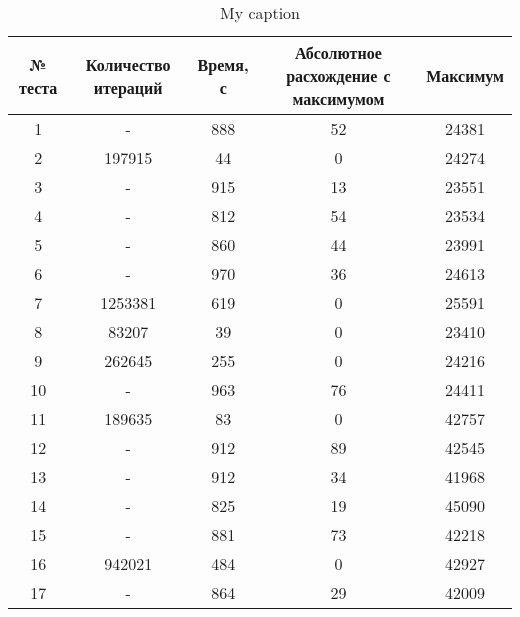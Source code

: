 \begin{table}[]
\centering
\caption{My caption}
\label{my-label}
\begin{tabular}{|c|c|c|c|c|}
\hline
№ теста & Количество итераций & Время, с & Абсолютное расхождение с максимумом & Максимум \\ \hline
1       & -                   & 888      & 52                                  & 24381    \\ \hline
2       & 197915              & 44       & 0                                   & 24274    \\ \hline
3       & -                   & 915      & 13                                  & 23551    \\ \hline
4       & -                   & 812      & 54                                  & 23534    \\ \hline
5       & -                   & 860      & 44                                  & 23991    \\ \hline
6       & -                   & 970      & 36                                  & 24613    \\ \hline
7       & 1253381             & 619      & 0                                   & 25591    \\ \hline
8       & 83207               & 39       & 0                                   & 23410    \\ \hline
9       & 262645              & 255      & 0                                   & 24216    \\ \hline
10      & -                   & 963      & 76                                  & 24411    \\ \hline
11      & 189635              & 83       & 0                                   & 42757    \\ \hline
12      & -                   & 912      & 89                                  & 42545    \\ \hline
13      & -                   & 912      & 34                                  & 41968    \\ \hline
14      & -                   & 825      & 19                                  & 45090    \\ \hline
15      & -                   & 881      & 73                                  & 42218    \\ \hline
16      & 942021              & 484      & 0                                   & 42927    \\ \hline
17      & -                   & 864      & 29                                  & 42009    \\ \hline

\end{tabular}
\end{table}
